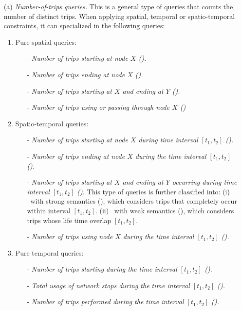 \begin{itemize} [leftmargin=6mm]
	\item[(a)] {\em Number-of-trips queries.} This is a general type of queries that counts the number of distinct trips. When applying spatial, temporal or spatio-temporal constraints, it can specialized in the following queries:
	
	\begin{enumerate}[leftmargin=3mm]
		\setlength{\itemindent}{0mm}
		\item Pure spatial queries:
		\begin{itemize}
			[leftmargin=3mm]
			\setlength{\itemindent}{0mm}
			\item[-] {\em Number of trips starting at node $X$ (\Sswx).}
			\item[-] {\em Number of trips ending at node $X$ (\Sewx).} 
			\item[-] {\em Number of trips starting at $X$ and ending at $Y$ (\Sfxty).}
			\item[-] {\em Number of trips using or passing through node $X$ (\Sux)}
		\end{itemize}
		
		\item Spatio-temporal queries:
		\begin{itemize}[leftmargin=3mm]
			\setlength{\itemindent}{0mm}
			\item[-] {\em Number of trips starting at node $X$ during time interval $[t_1,t_2]$ (\Tswx).}
			\item[-] {\em Number of trips ending at node $X$ during the time interval $[t_1,t_2]$ (\Tewx). }
			\item[-] {\em Number of trips starting at $X$ and ending at $Y$ occurring during  time interval $[t_1,t_2]$ (\Tfxty).} This type of queries is further classified into: (i)  \Tfxty\ with strong semantics (\Tfxtys), which considers trips that completely occur within interval $[t_1,t_2]$. (ii) \Tfxty\ with weak semantics (\Tfxtyw), which considers trips whose life time overlap $[t_1,t_2]$.
			\item[-] {\em Number of trips using node $X$ during the time interval $[t_1,t_2]$ (\Tux).}
		\end{itemize}
		
		\item Pure temporal queries:
		\begin{itemize}	[leftmargin=3mm]
			\setlength{\itemindent}{0mm}
			\item[-] {\em Number of trips starting during the time interval $[t_1,t_2]$ (\Tst). } 
			\item[-] {\em Total usage of network stops during the time interval $[t_1,t_2]$ (\Tut).} 
			\item[-] {\em Number of trips performed during the time interval $[t_1,t_2]$ (\Ttt).} 
		\end{itemize}
		

\end{enumerate}
\end{itemize}
